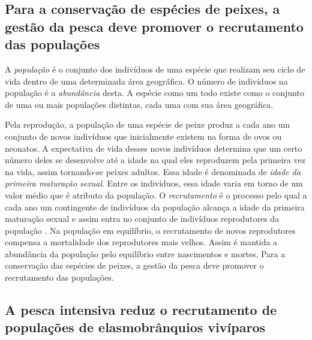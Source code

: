 \documentclass[a4paper,11pt,twoside,showtrims,onecolumn,openright,final]{memoir}
\begin{document}
\subsection*{Para a conservação de espécies de peixes, 
             a gestão da pesca deve promover o recrutamento das populações}

A \emph{população} é o conjunto dos indivíduos de uma espécie que realizam seu ciclo de vida 
dentro de uma determinada área geográfica. O número de indivíduos na população é a 
\emph{abundância} desta. A espécie como um todo existe como o conjunto de uma ou mais populações 
distintas, cada uma com sua área geográfica.

Pela reprodução, a população de uma espécie de peixe produz a cada ano um conjunto de novos 
indivíduos que inicialmente existem na forma de ovos ou neonatos. A expectativa de vida desses 
novos indivíduos determina que um certo número deles se desenvolve até a idade na qual eles 
reproduzem pela primeira vez na vida, assim tornando-se peixes adultos. Essa idade é denominada 
de \emph{idade da primeira maturação sexual}. Entre os indivíduos, essa idade varia em torno de um valor 
médio que é atributo da população. O \emph{recrutamento} é o processo pelo qual a cada ano um contingente 
de indivíduos da população alcança a idade da primeira maturação sexual e assim entra no conjunto 
de indivíduos reprodutores da população \citep{ricker1975}. %
Na população em equilíbrio, o recrutamento de novos reprodutores compensa a mortalidade dos 
reprodutores mais velhos. Assim é mantida a abundância da população pelo equilíbrio entre 
nascimentos e mortes. Para a conservação das espécies de peixes, a gestão da pesca deve promover 
o recrutamento das populações.

\subsection*{A pesca intensiva reduz o recrutamento de populações de elasmobrânquios vivíparos}
\end{document}
